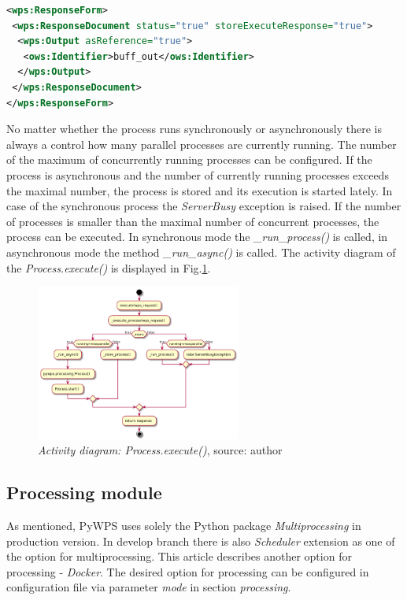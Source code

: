 \documentclass{gifce}
\begin{document}
\begin{lstlisting}[basicstyle=\small,caption={ReponseForm element of ExecuteRequest XML},language=XML,label={lst:Execute_ResponseForm}]
<wps:ResponseForm>
 <wps:ResponseDocument status="true" storeExecuteResponse="true">
  <wps:Output asReference="true">
   <ows:Identifier>buff_out</ows:Identifier>
  </wps:Output>
 </wps:ResponseDocument>
</wps:ResponseForm>
\end{lstlisting}

No matter whether the process runs synchronously or asynchronously there is always a control how many parallel processes are currently
running. The number of the maximum of concurrently running processes can be configured. If the process is asynchronous and the number of currently running processes exceeds the maximal number, the process is stored and its execution is started lately. In case of the synchronous process the \textit{ServerBusy} exception is raised. If the number of processes is smaller than the maximal number of 
concurrent processes, the process can be executed. In synchronous mode the \textit{\_run\_process()} is called, in asynchronous mode the method \textit{\_run\_async()} is called. The activity diagram of the \textit{Process.execute()} is displayed in Fig.\ref{fig:Diag_process_execute}.

\begin{figure}[h!]
\centering
\includegraphics[width=0.6\textwidth]{img/Diag_process_execute.png}
\caption{\textit{Activity diagram: Process.execute()}, source: author}
\label{fig:Diag_process_execute}
\end{figure}

\subsection{Processing module}
As mentioned, PyWPS uses solely the Python package \textit{Multiprocessing} in production version.
In develop branch there is also \textit{Scheduler} extension as one of the option for multiprocessing. This article
describes another option for processing - \textit{Docker}. The desired option for processing can be configured in configuration file via parameter \textit{mode} in section \textit{processing}.
\end{document}
